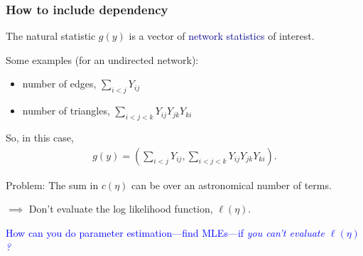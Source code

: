 \documentclass[ 10pt]{beamer}
\def\YY{{\mathcal Y}}
\begin{document}
\frame
{
\frametitle{How to include dependency}
The natural statistic $g(y)$ is a vector of \textcolor{darkblue}{network statistics} of interest.  
\vspace{2mm}

Some examples (for an undirected network):
\begin{itemize}
	\item number of edges, $\sum_{i<j} Y_{ij}$
	\item number of triangles, $\sum_{i < j < k} Y_{ij}Y_{jk}Y_{ki}$
\end{itemize}
\vspace{2mm}

So, in this case,
\begin{align*}
	g(y) = \left( \sum_{i<j} Y_{ij}, 
					\sum_{i < j < k} Y_{ij}Y_{jk}Y_{ki} \right ).
\end{align*}
\vspace{2mm}

\pause
\alert{ Problem:} The sum in $c(\eta)$ can be over an astronomical number of terms.
\vspace{1mm}

$\implies$ Don't evaluate the log likelihood function, $\ell(\eta)$.

\vspace{3mm}

\textcolor{blue}{How can you do parameter estimation---find MLEs---if \emph{you can't 
evaluate $\ell(\eta)$?} }

}

%
%
%
%
%
%
\end{document}
